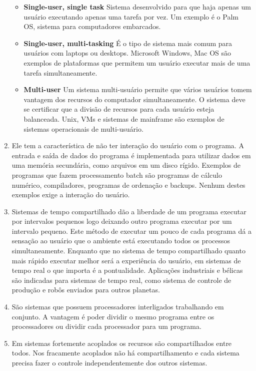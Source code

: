 \documentclass[12pt,a4paper]{article}
\begin{document}
\begin{enumerate}
\begin{itemize}
\item \textbf{Single-user, single task} Sistema desenvolvido para que haja apenas um
usuário executando apenas uma tarefa por vez. Um exemplo é o Palm OS, sistema
para computadores embarcados.

\item \textbf{Single-user, multi-tasking} É o tipo de sistema mais comum para usuários
com laptops ou desktops. Microsoft Windows, Mac OS são exemplos de
plataformas que permitem um usuário executar mais de uma tarefa simultaneamente.

\item \textbf{Multi-user} Um sistema multi-usuário permite que vários usuários
tomem vantagem dos recursos do computador simultaneamente. O sistema deve se
certificar que a divisão de recursos para cada usuário esteja balanceada.
Unix, VMs e sistemas de mainframe são exemplos de sistemas operacionais de
multi-usuário.
\end{itemize}

\item
Ele tem a característica de não ter interação do usuário com o programa.
A entrada e saída de dados do programa é implementada para utilizar dados
em uma memória secundária, como arquivos em um disco rígido. Exemplos de
programas que fazem processamento batch são programas de cálculo numérico,
compiladores, programas de ordenação e backups. Nenhum destes exemplos exige
a interação do usuário.

\item
Sistemas de tempo compartilhado dão a liberdade de um programa executar por
intervalos pequenos logo deixando outro programa executar por um intervalo 
pequeno. Este método de executar um pouco de cada programa dá a sensação
ao usuário que o ambiente está executando todos os processos 
simultaneamente. Enquanto que no sistema de tempo compartilhado quanto mais
rápido executar melhor será a experiência do usuário, em sistemas de tempo
real o que importa é a pontualidade. Aplicações industriais e bélicas são
indicadas para sistemas de tempo real, como sistema de controle de produção
e robôs enviados para outros planetas.

\item
São sistemas que possuem processadores interligados trabalhando em conjunto.
A vantagem é poder dividir o mesmo programa entre os processadores ou dividir
cada processador para um programa.

\item
Em sistemas fortemente acoplados os recursos são compartilhados entre todos.
Nos fracamente acoplados não há compartilhamento e cada sistema precisa
fazer o controle independentemente dos outros sistemas.


\end{enumerate}
\end{document}
